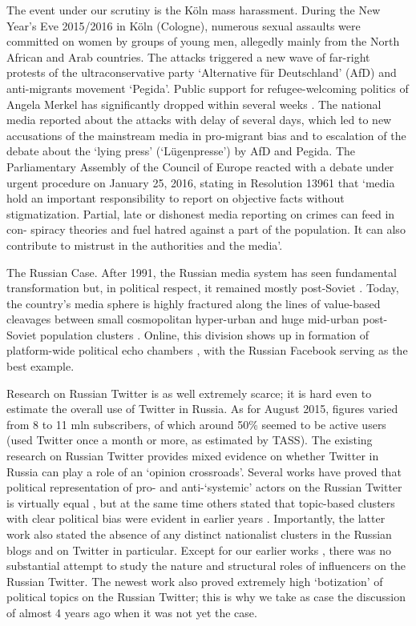 The event under our scrutiny is the Köln mass harassment. During the New Year’s Eve 2015/2016 in Köln (Cologne), numerous sexual assaults were committed on women by groups of young men, allegedly mainly from the North African and Arab countries. The attacks triggered a new wave of far-right protests of the ultraconservative party ‘Alternative für Deutschland’ (AfD) and anti-migrants movement ‘Pegida’. Public support for refugee-welcoming politics of Angela Merkel has significantly dropped within several weeks \cite{Dearden}. The national media reported about the attacks with delay of several days, which led to new accusations of the mainstream media in pro-migrant bias and to escalation of the debate about the ‘lying press’ (‘Lügenpresse’) by AfD and Pegida. The Parliamentary Assembly of the Council of Europe reacted with a debate under urgent procedure on January 25, 2016, stating in Resolution 13961 that ‘media hold an important responsibility to report on objective facts without stigmatization. Partial, late or dishonest media reporting on crimes can feed in con- spiracy theories and fuel hatred against a part of the population. It can also contribute to mistrust in the authorities and the media’.

The Russian Case. After 1991, the Russian media system has seen fundamental transformation but, in political respect, it remained mostly post-Soviet \cite{Vartanova}. Today, the country’s media sphere is highly fractured along the lines of value-based cleavages between small cosmopolitan hyper-urban and huge mid-urban post-Soviet population clusters \cite{BodrunovaLitvinenko2013,BodrunovaLitvinenkoGavraYakunin}. Online, this division shows up in formation of platform-wide political echo chambers \cite{BodrunovaLitvinenkoGavraYakunin}, with the Russian Facebook serving as the best example.

Research on Russian Twitter is as well extremely scarce; it is hard even to estimate the overall use of Twitter in Russia. As for August 2015, figures varied from 8 to 11 mln subscribers, of which around 50\% seemed to be active users (used Twitter once a month or more, as estimated by TASS). The existing research on Russian Twitter provides mixed evidence on whether Twitter in Russia can play a role of an ‘opinion crossroads’. Several works have proved that political representation of pro- and anti-‘systemic’ actors on the Russian Twitter is virtually equal \cite{Greene,NikiporetsTakigawa}, but at the same time others stated that topic-based clusters with clear political bias were evident in earlier years \cite{BarashKelly}. Importantly, the latter work also stated the absence of any distinct nationalist clusters in the Russian blogs and on Twitter in particular. Except for our earlier works \cite{BodrunovaLitvinenkoBlekanov2016,BodrunovaBlekanovMaksimov}, there was no substantial attempt to study the nature and structural roles of influencers on the Russian Twitter. The newest work \cite{SanovichStukalPenfoldBrown} also proved extremely high ‘botization’ of political topics on the Russian Twitter; this is why we take as case the discussion of almost 4 years ago when it was not yet the case.

